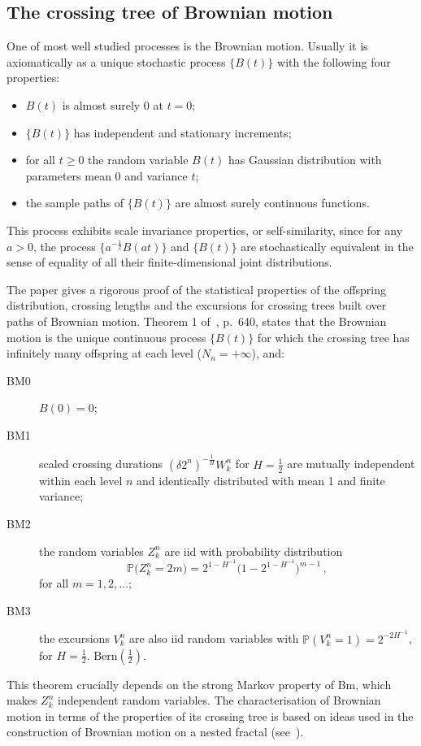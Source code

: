\documentclass[a4paper]{article}
\newcommand{\pr}{\mathbb{P}}
\begin{document}

\subsection{The crossing tree of Brownian motion} %
\label{sub:the_crossing_tree_of_brownian_motion}

One of most well studied processes is the Brownian motion. Usually it is axiomatically
as a unique stochastic process $\bigl\{B(t)\bigr\}$ with the following four properties:
\begin{itemize}
    \item $B(t)$ is almost surely $0$ at $t=0$;
    \item $\{B(t)\}$ has independent and stationary increments;
    \item for all $t\geq 0$ the random variable $B(t)$ has Gaussian distribution with
    parameters mean $0$ and variance $t$;
    \item the sample paths of $\{B(t)\}$ are almost surely continuous functions.
\end{itemize}
This process exhibits scale invariance properties, or self-similarity, since for any
$a>0$, the process $\bigl\{a^{-\frac{1}{2}} B(at)\bigr\}$ and $\{B(t)\}$ are stochastically
equivalent in the sense of equality of all their finite-dimensional joint distributions.

The paper \cite{ECP1673} gives a rigorous proof of the statistical properties of
the offspring distribution, crossing lengths and the excursions for crossing trees
built over paths of Brownian motion. Theorem 1 of~\cite{ECP1673}, p.~640, states
that the Brownian motion is the unique continuous process $\{B(t)\}$ for which the
crossing tree has infinitely many offspring at each level ($N_n = +\infty$), and:
\begin{description}
    \item[BM0] $B(0) = 0$;
    \item[BM1] scaled crossing durations $(\delta 2^n)^{-\frac{1}{H}} W_k^n$ for
    $H = \frac{1}{2}$ are mutually independent within each level $n$ and identically
    distributed with mean 1 and finite variance;
    \item[BM2] the random variables $Z_k^n$ are iid with probability distribution
    \[ \pr\bigl(Z_k^n=2m\bigr) = 2^{1-H^{-1}}\bigl(1-2^{1-H^{-1}}\bigr)^{m-1} \,,\]
    for all $m=1,2,\ldots$;
    \item[BM3] the excursions $V_k^n$ are also iid random variables with 
    $\pr( V_k^n = 1 ) = 2^{-2H^{-1}}$, for $H = \frac{1}{2}$.
    $\text{Bern}(\frac{1}{2})$.
\end{description}
This theorem crucially depends on the strong Markov property of Bm, which makes $Z_k^n$
independent random variables. The characterisation of Brownian motion in terms of
the properties of its crossing tree is based on ideas used in the construction of
Brownian motion on a nested fractal (see~\cite{BarlowPerkins88}).
\end{document}
